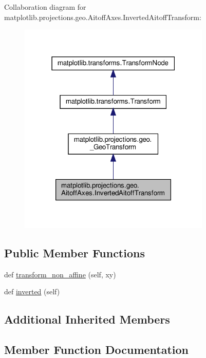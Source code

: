 Collaboration diagram for matplotlib.\+projections.\+geo.\+Aitoff\+Axes.\+Inverted\+Aitoff\+Transform\+:
\nopagebreak
\begin{figure}[H]
\begin{center}
\leavevmode
\includegraphics[width=259pt]{classmatplotlib_1_1projections_1_1geo_1_1AitoffAxes_1_1InvertedAitoffTransform__coll__graph}
\end{center}
\end{figure}
\subsection*{Public Member Functions}
\begin{DoxyCompactItemize}
\item 
def \hyperlink{classmatplotlib_1_1projections_1_1geo_1_1AitoffAxes_1_1InvertedAitoffTransform_a73dec1589dcaf97c5b9f0ee4318c6ae4}{transform\+\_\+non\+\_\+affine} (self, xy)
\item 
def \hyperlink{classmatplotlib_1_1projections_1_1geo_1_1AitoffAxes_1_1InvertedAitoffTransform_a359dbfa621c2fe3372d2065cffda45b0}{inverted} (self)
\end{DoxyCompactItemize}
\subsection*{Additional Inherited Members}


\subsection{Member Function Documentation}
\mbox{\label{classmatplotlib_1_1projections_1_1geo_1_1AitoffAxes_1_1InvertedAitoffTransform_a359dbfa621c2fe3372d2065cffda45b0}} 
